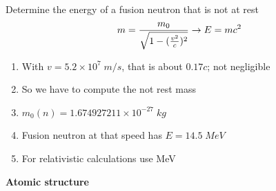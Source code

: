 \documentclass[aspectratio=1610,pdftex,dvipsnames,compress,xcolor={dvipsnames}]{beamer}
\begin{document}
\begin{frame}{Determine the energy of a fusion neutron that is not at rest}
    \begin{equation}
        \LARGE 
        m = \frac{m_0}{\sqrt{1-(\frac{v^2}{c})^2}} \rightarrow E = m c^2
    \end{equation}
    
    \vspace*{\fill}

    \begin{enumerate}[series=outerlist,topsep=0pt,itemsep=21pt,leftmargin=*,label=(\arabic*)]
        \item[]With $v = 5.2 \times 10^7 \; m/s$, that is about $0.17c$; not negligible
        \item[]So we have to compute the not rest mass
        \item[]$m_0(n) = 1.674927211 \times 10^{-27} \; kg$
        \item[]Fusion neutron at that speed has $E = 14.5 \; MeV$
        \item[]For relativistic calculations use MeV
    \end{enumerate}
\end{frame}


\begin{frame}[plain]{}
    \centering\LARGE\textbf{Atomic structure}
\end{frame}
\end{document}
